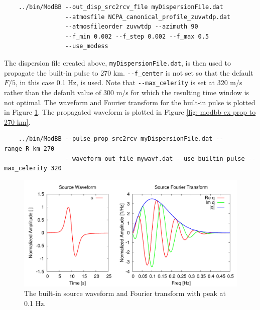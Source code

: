 \begin{verbatim} 
    ../bin/ModBB --out_disp_src2rcv_file myDispersionFile.dat 
                 --atmosfile NCPA_canonical_profile_zuvwtdp.dat 
                 --atmosfileorder zuvwtdp --azimuth 90 
                 --f_min 0.002 --f_step 0.002 --f_max 0.5
                 --use_modess
\end{verbatim}

The dispersion file created above, \verb+myDispersionFile.dat+, is then used to propagate the built-in pulse to 270 km. \verb+--f_center+ is not set so that the default $F/5$, in this case 0.1 Hz, is used. Note that \verb+--max_celerity+ is set at 320 m/s rather than the default value of 300 m/s for which the resulting time window is not optimal. The waveform and Fourier transform for the built-in pulse is plotted in Figure \ref{fig: modbb ex built-in pulse}. The propagated waveform is plotted in Figure \ref{fig: modbb ex prop to 270 km}. 

\begin{verbatim}
    ../bin/ModBB --pulse_prop_src2rcv myDispersionFile.dat --range_R_km 270 
                 --waveform_out_file mywavf.dat --use_builtin_pulse --max_celerity 320
\end{verbatim}

\begin{figure}
\begin{center}
\includegraphics[scale=0.65]{figs/modbb_ex_source_model}
\end{center}
\caption{The built-in source waveform and Fourier transform with peak at 0.1 Hz.}
\label{fig: modbb ex built-in pulse}
\end{figure}

